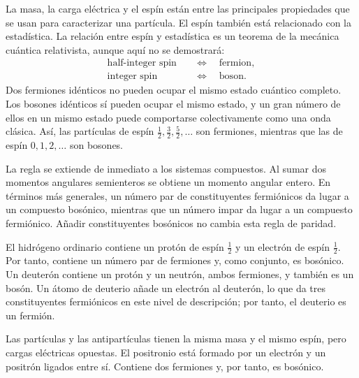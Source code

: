 La masa, la carga eléctrica y el espín están entre las principales propiedades que se usan para caracterizar una partícula. El espín también está relacionado con la estadística. La relación entre espín y estadística es un teorema de la mecánica cuántica relativista, aunque aquí no se demostrará:
\begin{equation}
\begin{aligned}
\text{half-integer spin} &\quad\Longleftrightarrow\quad \text{fermion},\\
\text{integer spin} &\quad\Longleftrightarrow\quad \text{boson}.
\end{aligned}
\end{equation}
Dos fermiones idénticos no pueden ocupar el mismo estado cuántico completo. Los bosones idénticos sí pueden ocupar el mismo estado, y un gran número de ellos en un mismo estado puede comportarse colectivamente como una onda clásica. Así, las partículas de espín \(\tfrac12,\tfrac32,\tfrac52,\ldots\) son fermiones, mientras que las de espín \(0,1,2,\ldots\) son bosones.

La regla se extiende de inmediato a los sistemas compuestos. Al sumar dos momentos angulares semienteros se obtiene un momento angular entero. En términos más generales, un número par de constituyentes fermiónicos da lugar a un compuesto bosónico, mientras que un número impar da lugar a un compuesto fermiónico. Añadir constituyentes bosónicos no cambia esta regla de paridad.

El hidrógeno ordinario contiene un protón de espín \(\tfrac12\) y un electrón de espín \(\tfrac12\). Por tanto, contiene un número par de fermiones y, como conjunto, es bosónico. Un deuterón contiene un protón y un neutrón, ambos fermiones, y también es un bosón. Un átomo de deuterio añade un electrón al deuterón, lo que da tres constituyentes fermiónicos en este nivel de descripción; por tanto, el deuterio es un fermión.

Las partículas y las antipartículas tienen la misma masa y el mismo espín, pero cargas eléctricas opuestas. El positronio está formado por un electrón y un positrón ligados entre sí. Contiene dos fermiones y, por tanto, es bosónico.

